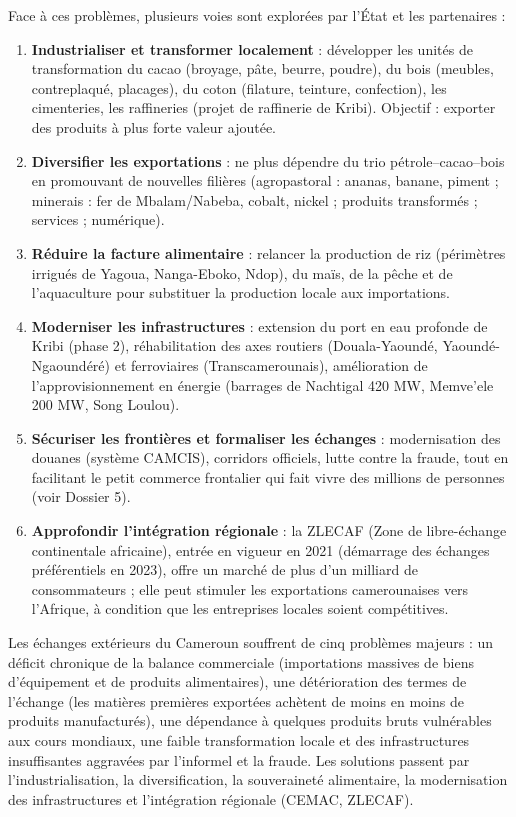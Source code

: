 \documentclass[11pt]{article}
\newcommand{\cle}[1]{{\popxbold\color{popdark}#1}}
\newcounter{popsec}
\newcounter{popsub}
\newcommand{\courssub}[1]{%
  \stepcounter{popsub}%
  \par\vspace{9pt}\noindent{\popxbold\fontsize{11.5}{13}\selectfont\color{popink}{\color{poporange}\thepopsec.\thepopsub}\hspace{6pt}#1}\par\nopagebreak\vspace{4pt}
}
\begin{document}
\courssub{Les pistes de solutions}

Face à ces problèmes, plusieurs voies sont explorées par l'État et les partenaires :

\begin{enumerate}
\item \textbf{Industrialiser et transformer localement} : développer les unités de transformation du cacao (broyage, pâte, beurre, poudre), du bois (meubles, contreplaqué, placages), du coton (filature, teinture, confection), les cimenteries, les raffineries (projet de raffinerie de Kribi). Objectif : exporter des produits à plus forte valeur ajoutée.
\item \textbf{Diversifier les exportations} : ne plus dépendre du trio pétrole--cacao--bois en promouvant de nouvelles filières (agropastoral : ananas, banane, piment ; minerais : fer de Mbalam/Nabeba, cobalt, nickel ; produits transformés ; services ; numérique).
\item \textbf{Réduire la facture alimentaire} : relancer la production de riz (périmètres irrigués de Yagoua, Nanga-Eboko, Ndop), du maïs, de la pêche et de l'aquaculture pour substituer la production locale aux importations.
\item \textbf{Moderniser les infrastructures} : extension du port en eau profonde de Kribi (phase 2), réhabilitation des axes routiers (Douala-Yaoundé, Yaoundé-Ngaoundéré) et ferroviaires (Transcamerounais), amélioration de l'approvisionnement en énergie (barrages de Nachtigal 420 MW, Memve'ele 200 MW, Song Loulou).
\item \textbf{Sécuriser les frontières et formaliser les échanges} : modernisation des douanes (système CAMCIS), corridors officiels, lutte contre la fraude, tout en facilitant le petit commerce frontalier qui fait vivre des millions de personnes (voir Dossier 5).
\item \textbf{Approfondir l'intégration régionale} : la \cle{ZLECAF} (Zone de libre-échange continentale africaine), entrée en vigueur en 2021 (démarrage des échanges préférentiels en 2023), offre un marché de plus d'un milliard de consommateurs ; elle peut stimuler les exportations camerounaises vers l'Afrique, à condition que les entreprises locales soient compétitives.
\end{enumerate}

\begin{aretenir}
Les échanges extérieurs du Cameroun souffrent de cinq problèmes majeurs : un \cle{déficit chronique de la balance commerciale} (importations massives de biens d'équipement et de produits alimentaires), une \cle{détérioration des termes de l'échange} (les matières premières exportées achètent de moins en moins de produits manufacturés), une \cle{dépendance} à quelques produits bruts vulnérables aux cours mondiaux, une \cle{faible transformation locale} et des \cle{infrastructures insuffisantes} aggravées par l'informel et la fraude. Les solutions passent par l'industrialisation, la diversification, la souveraineté alimentaire, la modernisation des infrastructures et l'intégration régionale (CEMAC, ZLECAF).
\end{aretenir}
\end{document}
